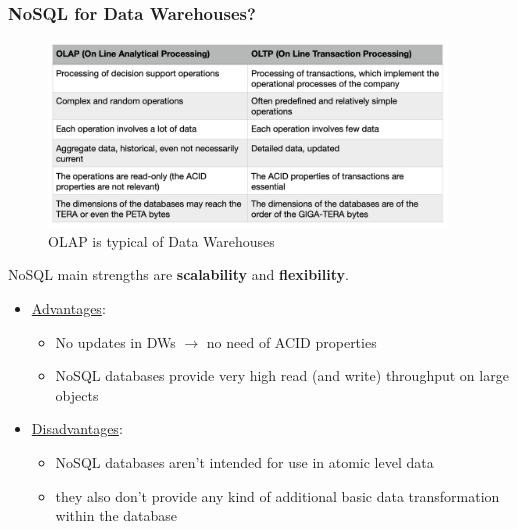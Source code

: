 \documentclass[10pt,a4paper]{article}
\begin{document}
\begin{justify}
\subsubsection{NoSQL for Data Warehouses?}
\begin{figure}[htp]
\centering
\includegraphics[width=300pt]{images/olap-vs-oltp}\hfill
\caption{OLAP is typical of Data Warehouses}
\end{figure}
NoSQL main strengths are \textbf{scalability} and \textbf{flexibility}.
\begin{itemize}
	\item \uline{Advantages}:
	\begin{itemize}
		\item No updates in DWs $\rightarrow$ no need of ACID properties
		\item NoSQL databases provide very high read (and write) throughput on large objects
	\end{itemize}
	\item \uline{Disadvantages}:
	\begin{itemize}
		\item NoSQL databases aren't intended for use in atomic level data
		\item they also don't provide any kind of additional basic data transformation within the database
	\end{itemize}
\end{itemize}

\end{justify}
\end{document}
